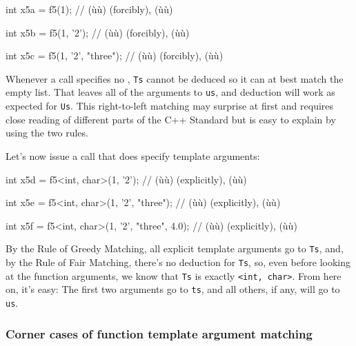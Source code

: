 \begin{emcppslisting}
int x5a = f5(1);
    // (ù{}ù) (forcibly), (ù{}ù)

int x5b = f5(1, '2');
    // (ù{}ù) (forcibly), (ù{}ù)

int x5c = f5(1, '2', "three");
    // (ù{}ù) (forcibly), (ù{}ù)
\end{emcppslisting}
    

\noindent Whenever a call specifies no , \lstinline!Ts!
cannot be deduced so it can at best match the empty list. That leaves
all of the arguments to \lstinline!us!, and deduction will work as expected
for \lstinline!Us!. This right-to-left matching may surprise at first and
requires close reading of different parts of the C++ Standard but is
easy to explain by using the two rules.

Let's now issue a call that does specify template arguments:

\begin{emcppslisting}
int x5d = f5<int, char>(1, '2');
    // (ù{}ù) (explicitly), (ù{}ù)

int x5e = f5<int, char>(1, '2', "three");
    // (ù{}ù) (explicitly), (ù{}ù)

int x5f = f5<int, char>(1, '2', "three", 4.0);
    // (ù{}ù) (explicitly), (ù{}ù)
\end{emcppslisting}
    

\noindent By the Rule of Greedy Matching, all explicit template arguments go to
\lstinline!Ts!, and, by the Rule of Fair Matching, there's no deduction for
\lstinline!Ts!, so, even before looking at the function arguments, we know
that \lstinline!Ts! is exactly \lstinline!<int,!~\lstinline!char>!. From here on,
it's easy: The first two arguments go to \lstinline!ts!, and all others, if
any, will go to \lstinline!us!.

\subsubsection[Corner cases of function template argument matching]{Corner cases of function template argument matching}\label{corner-cases-of-function-template-argument-matching}

